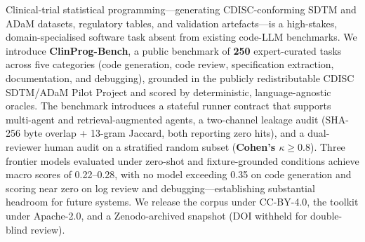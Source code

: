 Clinical-trial statistical programming---generating CDISC-conforming SDTM and ADaM
datasets, regulatory tables, and validation artefacts---is a high-stakes,
domain-specialised software task absent from existing code-LLM benchmarks. We
introduce \textbf{ClinProg-Bench}, a public benchmark of \textbf{250} expert-curated
tasks across five categories (code generation, code review, specification
extraction, documentation, and debugging), grounded in the publicly redistributable
CDISC SDTM/ADaM Pilot Project and scored by deterministic, language-agnostic
oracles. The benchmark introduces a stateful runner contract that supports
multi-agent and retrieval-augmented agents, a two-channel leakage audit
(SHA-256 byte overlap + 13-gram Jaccard, both reporting zero hits), and a
dual-reviewer human audit on a stratified random subset (\textbf{Cohen's $\kappa
\geq 0.8$}). Three frontier models evaluated under zero-shot and
fixture-grounded conditions achieve macro scores of 0.22--0.28, with no model
exceeding 0.35 on code generation and scoring near zero on log review and
debugging---establishing substantial headroom for future systems. We release
the corpus under CC-BY-4.0, the toolkit under Apache-2.0, and a Zenodo-archived
snapshot (DOI withheld for double-blind review).
